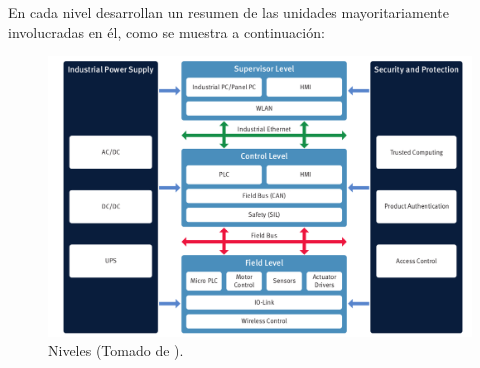 \documentclass[10pt,graphicx,caption,rotating]{article}
\begin{document}
En cada nivel desarrollan un resumen de las unidades mayoritariamente involucradas en él, como se muestra a continuación:
\begin{figure}[H]
	\centering
		\includegraphics[scale=0.4]{image2.png}
	\caption{Niveles (Tomado de \cite{page2}).}
	\label{fig2}
\end{figure}
\end{document}
